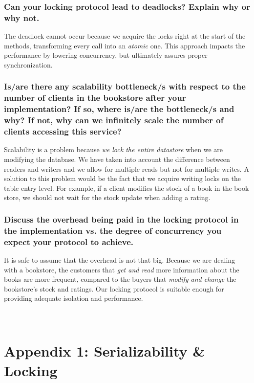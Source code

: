 \documentclass{article}      %
\begin{document}
\subsubsection*{Can your locking protocol lead to deadlocks? Explain why or why not.}

The deadlock cannot occur because we acquire the locks right at the start of the methods, transforming every call into an \emph{atomic} one. This approach impacts the performance by lowering concurrency, but ultimately assures proper synchronization.\\

\subsubsection*{Is/are there any scalability bottleneck/s with respect to the number of clients in the bookstore after your implementation? If so, where is/are the bottleneck/s and why? If not, why can we infinitely scale the number of clients accessing this service?}

Scalability is a problem because \emph{we lock the entire datastore} when we are modifying the database. We have taken into account the difference between readers and writers and we allow for multiple reads but not for multiple writes. A solution to this problem would be the fact that we acquire writing locks on the table entry level. For example, if a client modifies the stock of a book in the book store, we should not wait for the stock update when adding a rating.\\

\subsubsection*{Discuss the overhead being paid in the locking protocol in the implementation vs. the degree of concurrency you expect your protocol to achieve.}

It is safe to assume that the overhead is not that big. Because we are dealing with a bookstore, the customers that \emph{get and read}  more information about the books are more frequent, compared to the buyers that \emph{modify and change} the bookstore's stock and ratings. Our locking protocol is suitable enough for providing adequate isolation and performance.

\newpage
\appendix
\section*{\\Appendix 1: Serializability \& Locking}
\end{document}
